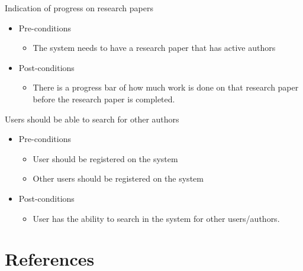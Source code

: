 \documentclass[a4paper,12pt]{report}
\begin{document}
	Indication of progress on research papers
	\begin{itemize}
		\item Pre-conditions
			\begin{itemize}
				\item The system needs to have a research paper that has active authors
			\end{itemize}
		\item Post-conditions
			\begin{itemize}
				\item There is a progress bar of how much work is done on that research paper before the research paper is completed.
			\end{itemize}
	\end{itemize}

	Users should be able to search for other authors
	\begin{itemize}
		\item Pre-conditions
			\begin{itemize}
				\item User should be registered on the system
				\item Other users should be registered on the system
			\end{itemize}
		\item Post-conditions
			\begin{itemize}
				\item User has the ability to search in the system for other users/authors.
			\end{itemize}
	\end{itemize}

\newpage
\section{References}
\end{document}
